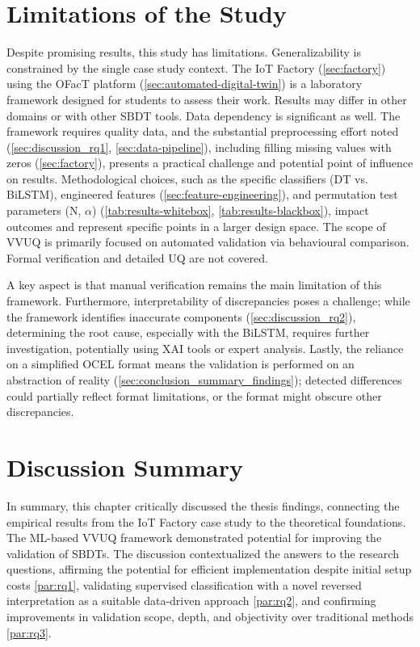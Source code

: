 \section{Limitations of the Study}
\label{sec:discussion_limitations}

Despite promising results, this study has limitations. Generalizability is constrained by the single case study context. The IoT Factory (\autoref{sec:factory}) using the OFacT platform (\autoref{sec:automated-digital-twin}) is a laboratory framework designed for students to assess their work. Results may differ in other domains or with other SBDT tools. Data dependency is significant as well. The framework requires quality data, and the substantial preprocessing effort noted (\autoref{sec:discussion_rq1}, \autoref{sec:data-pipeline}), including filling missing values with zeros (\autoref{sec:factory}), presents a practical challenge and potential point of influence on results. Methodological choices, such as the specific classifiers (DT vs. BiLSTM), engineered features (\autoref{sec:feature-engineering}), and permutation test parameters (N, $\alpha$) (\autoref{tab:results-whitebox}, \autoref{tab:results-blackbox}), impact outcomes and represent specific points in a larger design space. The scope of VVUQ is primarily focused on automated validation via behavioural comparison. Formal verification and detailed UQ are not covered.

A key aspect is that manual verification remains the main limitation of this framework. Furthermore, interpretability of discrepancies poses a challenge; while the framework identifies inaccurate components (\autoref{sec:discussion_rq2}), determining the root cause, especially with the BiLSTM, requires further investigation, potentially using XAI tools or expert analysis. Lastly, the reliance on a simplified OCEL format means the validation is performed on an abstraction of reality (\autoref{sec:conclusion_summary_findings}); detected differences could partially reflect format limitations, or the format might obscure other discrepancies.

\section{Discussion Summary}
\label{sec:discussion_summary}

In summary, this chapter critically discussed the thesis findings, connecting the empirical results from the IoT Factory case study to the theoretical foundations. The ML-based VVUQ framework demonstrated potential for improving the validation of SBDTs. The discussion contextualized the answers to the research questions, affirming the potential for efficient implementation despite initial setup costs \autoref{par:rq1}, validating supervised classification with a novel reversed interpretation as a suitable data-driven approach \autoref{par:rq2}, and confirming improvements in validation scope, depth, and objectivity over traditional methods \autoref{par:rq3}.